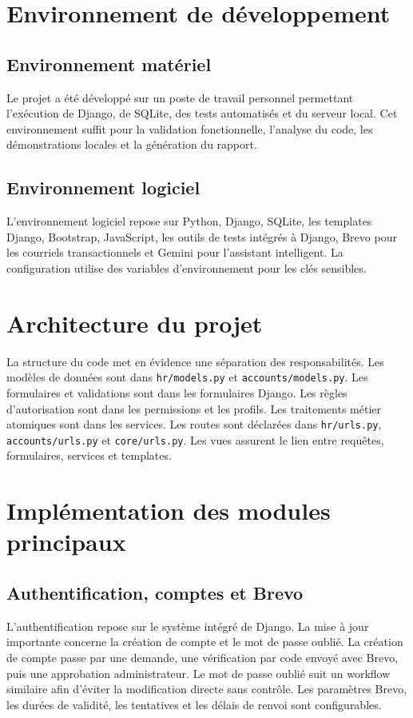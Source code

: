 \documentclass[12pt,a4paper]{report}
\begin{document}
\section{Environnement de développement}
\subsection{Environnement matériel}
Le projet a été développé sur un poste de travail personnel permettant l'exécution de Django, de SQLite, des tests automatisés et du serveur local. Cet environnement suffit pour la validation fonctionnelle, l'analyse du code, les démonstrations locales et la génération du rapport.

\subsection{Environnement logiciel}
L'environnement logiciel repose sur Python, Django, SQLite, les templates Django, Bootstrap, JavaScript, les outils de tests intégrés à Django, Brevo pour les courriels transactionnels et Gemini pour l'assistant intelligent. La configuration utilise des variables d'environnement pour les clés sensibles.

\section{Architecture du projet}
La structure du code met en évidence une séparation des responsabilités. Les modèles de données sont dans \texttt{hr/models.py} et \texttt{accounts/models.py}. Les formulaires et validations sont dans les formulaires Django. Les règles d'autorisation sont dans les permissions et les profils. Les traitements métier atomiques sont dans les services. Les routes sont déclarées dans \texttt{hr/urls.py}, \texttt{accounts/urls.py} et \texttt{core/urls.py}. Les vues assurent le lien entre requêtes, formulaires, services et templates.

\section{Implémentation des modules principaux}
\subsection{Authentification, comptes et Brevo}
L'authentification repose sur le système intégré de Django. La mise à jour importante concerne la création de compte et le mot de passe oublié. La création de compte passe par une demande, une vérification par code envoyé avec Brevo, puis une approbation administrateur. Le mot de passe oublié suit un workflow similaire afin d'éviter la modification directe sans contrôle. Les paramètres Brevo, les durées de validité, les tentatives et les délais de renvoi sont configurables.
\end{document}
